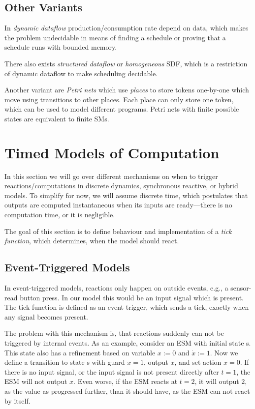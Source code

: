 \subsection{Other Variants}
In \emph{dynamic dataflow} production/consumption rate depend on data, which makes the problem undecidable in means of finding a schedule or proving that a schedule runs with bounded memory.

There also exists \emph{structured dataflow} or \emph{homogeneous} SDF, which is a restriction of dynamic dataflow to make scheduling decidable.

Another variant are \emph{Petri nets} which use \emph{places} to store tokens one-by-one which move using transitions to other places.
Each place can only store one token, which can be used to model different programs.
Petri nets with finite possible states are equivalent to finite SMs.

\section{Timed Models of Computation} \label{sec:6}
In this section we will go over different mechanisms on when to trigger reactions/computations in discrete dynamics, synchronous reactive, or hybrid models.
To simplify for now, we will assume discrete time, which postulates that outputs are computed instantaneous when its inputs are ready---there is no computation time, or it is negligible.

The goal of this section is to define behaviour and implementation of a \emph{tick function}, which determines, when the model should react.

\subsection{Event-Triggered Models}
In event-triggered models, reactions only happen on outside events, e.g., a sensor-read button press.
In our model this would be an input signal which is present.
The tick function is defined as an event trigger, which sends a tick, exactly when any signal becomes present.

The problem with this mechanism is, that reactions suddenly can not be triggered by internal events.
As an example, consider an ESM with initial state \textsf{s}.
This state also has a refinement based on variable \(x := 0\) and \(\dot x := 1\).
Now we define a transition to state \textsf{s} with guard \(x = 1\), output \(x\), and set action \(x = 0\).
If there is no input signal, or the input signal is not present directly after \(t=1\), the ESM will not output \(x\).
Even worse, if the ESM reacts at \(t=2\), it will output \(2\), as the value as progressed further, than it should have, as the ESM can not react by itself.

